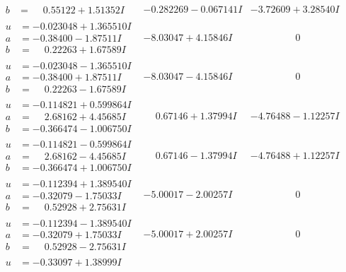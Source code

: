 \documentclass[1p]{elsarticle_modified}
\theoremstyle{definition}
\begin{document}
$$\begin{array}{c|c|c}
\begin{aligned}
b &= \phantom{-}0.55122 + 1.51352 I\end{aligned}
 & -0.282269 - 0.067141 I & -3.72609 + 3.28540 I \\ \hline\begin{aligned}
u &= -0.023048 + 1.365510 I \\
a &= -0.38400 - 1.87511 I \\
b &= \phantom{-}0.22263 + 1.67589 I\end{aligned}
 & -8.03047 + 4.15846 I & \phantom{-0.000000 } 0 \\ \hline\begin{aligned}
u &= -0.023048 - 1.365510 I \\
a &= -0.38400 + 1.87511 I \\
b &= \phantom{-}0.22263 - 1.67589 I\end{aligned}
 & -8.03047 - 4.15846 I & \phantom{-0.000000 } 0 \\ \hline\begin{aligned}
u &= -0.114821 + 0.599864 I \\
a &= \phantom{-}2.68162 + 4.45685 I \\
b &= -0.366474 - 1.006750 I\end{aligned}
 & \phantom{-}0.67146 + 1.37994 I & -4.76488 - 1.12257 I \\ \hline\begin{aligned}
u &= -0.114821 - 0.599864 I \\
a &= \phantom{-}2.68162 - 4.45685 I \\
b &= -0.366474 + 1.006750 I\end{aligned}
 & \phantom{-}0.67146 - 1.37994 I & -4.76488 + 1.12257 I \\ \hline\begin{aligned}
u &= -0.112394 + 1.389540 I \\
a &= -0.32079 - 1.75033 I \\
b &= \phantom{-}0.52928 + 2.75631 I\end{aligned}
 & -5.00017 - 2.00257 I & \phantom{-0.000000 } 0 \\ \hline\begin{aligned}
u &= -0.112394 - 1.389540 I \\
a &= -0.32079 + 1.75033 I \\
b &= \phantom{-}0.52928 - 2.75631 I\end{aligned}
 & -5.00017 + 2.00257 I & \phantom{-0.000000 } 0 \\ \hline\begin{aligned}
u &= -0.33097 + 1.38999 I \\

\end{aligned}
\end{array}$$
\end{document}
